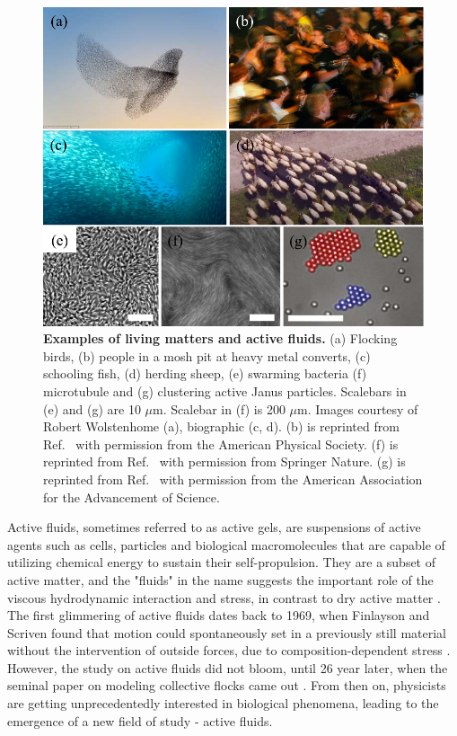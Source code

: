 \begin{figure}[!htbp]
	\begin{center}
	\includegraphics[width=5.5 in]{Figs/1-Intro/1.pdf}
	\end{center}
	\caption[Examples of Living Matters and Active Fluids]
	{
	\textbf{Examples of living matters and active fluids.}
  (a) Flocking birds, (b) people in a mosh pit at heavy metal converts, (c) schooling fish, (d) herding sheep, (e) swarming bacteria (f) microtubule and (g) clustering active Janus particles.
  Scalebars in (e) and (g) are 10 $\mu$m. Scalebar in (f) is 200 $\mu$m. Images courtesy of Robert Wolstenhome (a), biographic (c, d).
  (b) is reprinted from Ref.~\cite{Silverberg2013} with permission from the American Physical Society. (f) is reprinted from Ref.~\cite{DeCamp2015} with permission from
	Springer Nature. (g) is reprinted from Ref.~\cite{Palacci2013} with permission from
	the American Association for the Advancement of Science.
	}
	\label{fig:living-matter-examples}
\end{figure}

Active fluids, sometimes referred to as active gels, are suspensions of active agents such as cells, particles and biological macromolecules that are capable of utilizing chemical energy to sustain their self-propulsion. They are a subset of active matter, and the "fluids" in the name suggests the important role of the viscous hydrodynamic interaction and stress, in contrast to dry active matter \cite{Marchetti2013}. The first glimmering of active fluids dates back to 1969, when Finlayson and Scriven found that motion could spontaneously set in a previously still material without the intervention of outside forces, due to composition-dependent stress \cite{Finlayson1969}. However, the study on active fluids did not bloom, until 26 year later, when the seminal paper on modeling collective flocks came out \cite{Vicsek1995}. From then on, physicists are getting unprecedentedly interested in biological phenomena, leading to the emergence of a new field of study - active fluids.


